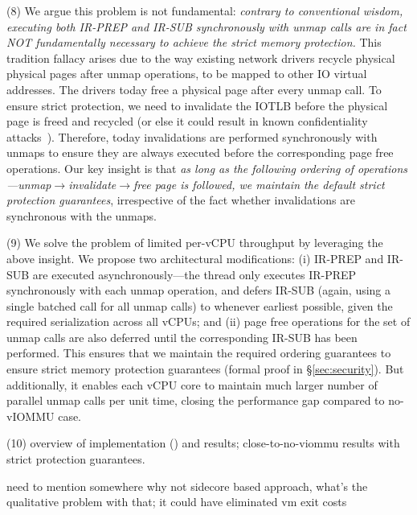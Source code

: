 (8) We argue this problem is not fundamental: \textit{contrary to conventional wisdom, executing both IR-PREP and IR-SUB synchronously with unmap calls are in fact NOT fundamentally necessary to achieve the strict memory protection.} This tradition fallacy arises due to the way existing network drivers recycle physical physical pages after unmap operations, to be mapped to other IO virtual addresses. The drivers today free a physical page after every unmap call. To ensure strict protection, we need to invalidate the IOTLB before the physical page is freed and recycled (or else it could result in known confidentiality attacks~\cite{}). Therefore, today invalidations are performed synchronously with unmaps to ensure they are always executed before the corresponding page free operations. Our key insight is that \textit{as long as the following ordering of operations---unmap$\rightarrow$invalidate$\rightarrow$free page is followed, we maintain the default strict protection guarantees}, irrespective of the fact whether invalidations are synchronous with the unmaps.  

(9) We solve the problem of limited per-vCPU throughput by leveraging the above insight. We propose two architectural modifications: (i) IR-PREP and IR-SUB are executed asynchronously---the thread only executes IR-PREP synchronously with each unmap operation, and defers IR-SUB (again, using a single batched call for all unmap calls) to whenever earliest possible, given the required serialization across all vCPUs; and (ii) page free operations for the set of unmap calls are also deferred until the corresponding IR-SUB has been performed. This ensures that we maintain the required ordering guarantees to ensure strict memory protection guarantees (formal proof in \S\ref{sec:security}). But additionally, it enables each vCPU core to maintain much larger number of parallel unmap calls per unit time, closing the performance gap compared to no-vIOMMU case.


(10) overview of implementation () and results; close-to-no-viommu results with strict protection guarantees.

need to mention somewhere why not sidecore based approach, what's the qualitative problem with that; it could have eliminated vm exit costs






